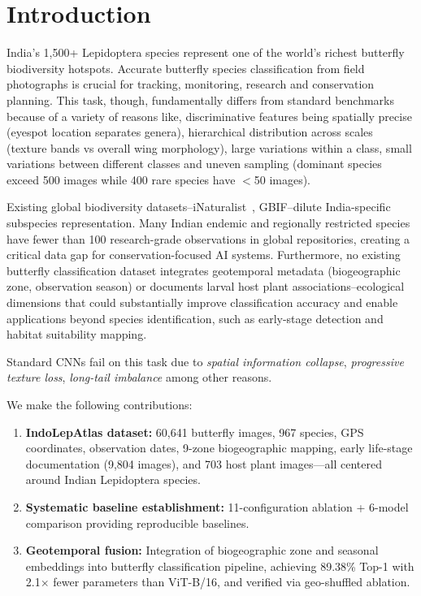 \documentclass[runningheads]{llncs}
\begin{document}
\section{Introduction}

India's 1,500+ Lepidoptera species represent one of the world's richest butterfly biodiversity hotspots. Accurate butterfly species classification from field photographs is crucial for tracking, monitoring, research and conservation planning. This task, though, fundamentally differs from standard benchmarks because of a variety of reasons like, discriminative features being spatially precise (eyespot location separates genera), hierarchical distribution across scales (texture bands vs overall wing morphology), large variations within a class, small variations between different classes and uneven sampling (dominant species exceed 500 images while 400 rare species have $<$50 images).

Existing global biodiversity datasets--iNaturalist~\cite{vanhorn2018inaturalist}, GBIF--dilute India-specific subspecies representation. Many Indian endemic and regionally restricted species have fewer than 100 research-grade observations in global repositories, creating a critical data gap for conservation-focused AI systems. Furthermore, no existing butterfly classification dataset integrates geotemporal metadata (biogeographic zone, observation season) or documents larval host plant associations--ecological dimensions that could substantially improve classification accuracy and enable applications beyond species identification, such as early-stage detection and habitat suitability mapping.

Standard CNNs fail on this task due to \textit{spatial information collapse}, \textit{progressive texture loss}, \textit{long-tail imbalance} among other reasons.

We make the following contributions:
\begin{enumerate}[label=(\arabic*)]
    \item \textbf{IndoLepAtlas dataset:} 60,641 butterfly images, 967 species, GPS coordinates, observation dates, 9-zone biogeographic mapping, early life-stage documentation (9,804 images), and 703 host plant images---all centered around Indian Lepidoptera species.
    \item \textbf{Systematic baseline establishment:} 11-configuration ablation + 6-model comparison providing reproducible baselines.
    \item \textbf{Geotemporal fusion:} Integration of biogeographic zone and seasonal embeddings into butterfly classification pipeline, achieving 89.38\% Top-1 with 2.1$\times$ fewer parameters than ViT-B/16, and verified via geo-shuffled ablation.
\end{enumerate}
\end{document}
